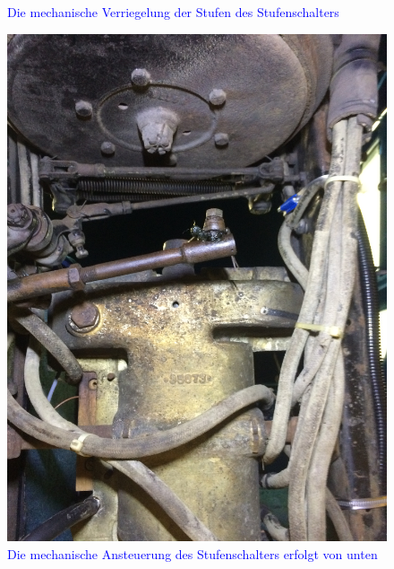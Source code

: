 \begin{landscape}
\begin{figure}[h]
	\caption{\textcolor{blue}{Die mechanische Verriegelung der Stufen des Stufenschalters}}
	\label{fig:Stufenschalter_2}
\end{figure}
\begin{figure}[h]
	\centering
		\includegraphics[angle=180,width=1.30\textwidth]{images/Anhang/Stufenschalter_1.jpg}
	\caption{\textcolor{blue}{Die mechanische Ansteuerung des Stufenschalters erfolgt von unten}}
	\label{fig:Stufenschalter_1}
\end{figure}\end{landscape}